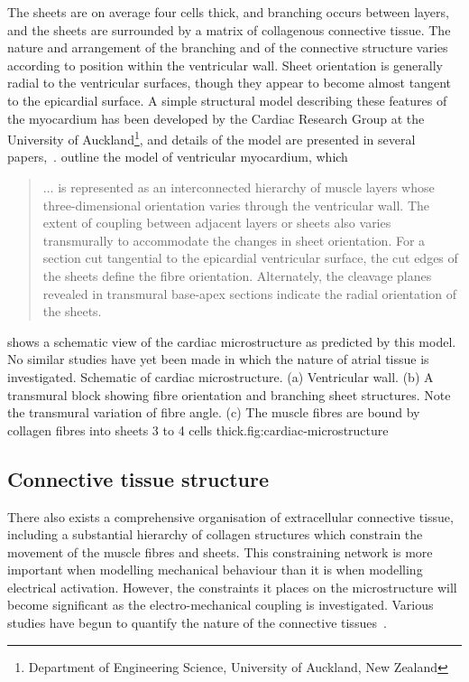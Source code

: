 The sheets are on average four cells thick, and branching occurs between
layers, and the sheets are surrounded by a matrix of collagenous connective
tissue.  The nature and arrangement of the branching and of the connective
structure varies according to position within the ventricular wall.  Sheet
orientation is generally radial to the ventricular surfaces, though they
appear to become almost tangent to the epicardial surface.  A simple
structural model describing these features of the myocardium has been
developed by the Cardiac Research Group at the University of
Auckland\footnote{Department of Engineering Science, University of Auckland,
  New Zealand}, and details of the model are presented in several
papers,~\cite{hunter:pilkington:1993,hunter:panfilov:1996}.
\citet[p.3]{hunter:panfilov:1996} outline the model of ventricular
myocardium, which 
\begin{quote}
  $\ldots$ is represented as an interconnected hierarchy of muscle layers
  whose three-dimensional orientation varies through the ventricular wall.
  The extent of coupling between adjacent layers or sheets also varies
  transmurally to accommodate the changes in sheet orientation.  For a section
  cut tangential to the epicardial ventricular surface, the cut edges of the
  sheets define the fibre orientation.  Alternately, the cleavage planes
  revealed in transmural base-apex sections indicate the radial orientation of
  the sheets.
\end{quote}
 shows a schematic view of the cardiac
microstructure as predicted by this model.  No similar studies have yet been
made in which the nature of atrial tissue is investigated.
{Schematic of cardiac microstructure.  (a) Ventricular wall.  (b) A transmural
  block showing fibre orientation and branching sheet structures.  Note the
  transmural variation of fibre angle.  (c) The muscle fibres are bound by
  collagen fibres into sheets 3 to 4 cells thick.}{fig:cardiac-microstructure}{}

\subsection{Connective tissue structure}

There also exists a comprehensive organisation of extracellular connective
tissue, including a substantial hierarchy of collagen structures which
constrain the movement of the muscle fibres and sheets.  This constraining
network is more important when modelling mechanical behaviour than it is when
modelling electrical activation.  However, the constraints it places on the
microstructure will become significant as the electro-mechanical coupling is
investigated.  Various studies have begun to quantify the nature of the
connective tissues~\cite{caulfield:1979,mackenna:1994}.

